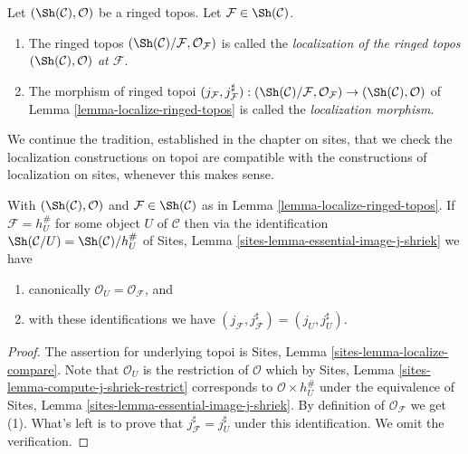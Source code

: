 \begin{definition}
\label{definition-localize-ringed-topos}
Let $(\Sh(\mathcal{C}), \mathcal{O})$ be a ringed topos.
Let $\mathcal{F} \in \Sh(\mathcal{C})$.
\begin{enumerate}
\item The ringed topos
$(\Sh(\mathcal{C})/\mathcal{F}, \mathcal{O}_\mathcal{F})$
is called the
{\it localization of the ringed topos
$(\Sh(\mathcal{C}), \mathcal{O})$ at $\mathcal{F}$}.
\item The morphism of ringed topoi
$(j_\mathcal{F}, j_\mathcal{F}^\sharp) :
(\Sh(\mathcal{C})/\mathcal{F}, \mathcal{O}_\mathcal{F})
\to
(\Sh(\mathcal{C}), \mathcal{O})$ of
Lemma \ref{lemma-localize-ringed-topos}
is called the {\it localization morphism}.
\end{enumerate}
\end{definition}

\noindent
We continue the tradition, established in the chapter on sites, that we
check the localization constructions on topoi are compatible with the
constructions of localization on sites, whenever this makes sense.

\begin{lemma}
\label{lemma-localize-compare}
With
$(\Sh(\mathcal{C}), \mathcal{O})$ and
$\mathcal{F} \in \Sh(\mathcal{C})$ as in
Lemma \ref{lemma-localize-ringed-topos}.
If $\mathcal{F} = h_U^\#$ for some object $U$ of $\mathcal{C}$
then via the identification
$\Sh(\mathcal{C}/U) = \Sh(\mathcal{C})/h_U^\#$ of
Sites, Lemma \ref{sites-lemma-essential-image-j-shriek}
we have
\begin{enumerate}
\item canonically $\mathcal{O}_U = \mathcal{O}_\mathcal{F}$, and
\item with these identifications
we have $(j_\mathcal{F}, j_\mathcal{F}^\sharp) = (j_U, j_U^\sharp)$.
\end{enumerate}
\end{lemma}

\begin{proof}
The assertion for underlying topoi is
Sites, Lemma \ref{sites-lemma-localize-compare}.
Note that $\mathcal{O}_U$ is the restriction of $\mathcal{O}$
which by
Sites, Lemma \ref{sites-lemma-compute-j-shriek-restrict}
corresponds to $\mathcal{O} \times h_U^\#$ under the equivalence of
Sites, Lemma \ref{sites-lemma-essential-image-j-shriek}.
By definition of $\mathcal{O}_\mathcal{F}$ we get (1).
What's left is to prove that $j_\mathcal{F}^\sharp = j_U^\sharp$
under this identification. We omit the verification.
\end{proof}

